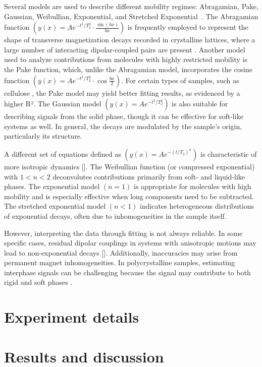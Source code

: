 \documentclass[a4paper,12pt]{article}
\begin{document}
Several models are used to describe different mobility regimes: Abragamian, Pake, Gaussian, Weibullian, Exponential, and Stretched Exponential~\cite{Rntzsch2018}. 
The Abragamian function \((y(x) = A e^{-t^2/T_2^2} \cdot \frac{\sin(bx)}{bx})\) is frequently employed to represent the shape of transverse magnetization decays recorded in crystalline lattices, where a large number of interacting dipolar-coupled pairs are present \cite{Besghini2019}. 
Another model used to analyze contributions from molecules with highly restricted mobility is the Pake function, which, unlike the Abragamian model, incorporates the cosine function \((y(x) = A e^{-t^2/T_2^2} \cdot \cos \frac{bx}{2})\).
For certain types of samples, such as cellulose \cite{Grunin2017, Grunin2019}, the Pake model may yield better fitting results, as evidenced by a higher R². 
The Gaussian model \((y(x) = A e^{-t^2/T_2^2})\) is also suitable for describing signals from the solid phase, though it can be effective for soft-like systems as well. 
In general, the decays are modulated by the sample’s origin, particularly its structure.

A different set of equations defined as \((y(x) = A e^{-(t/T_2)^n})\) is characteristic of more isotropic dynamics []. 
The Weibullian function (or compressed exponential) \cite{Rntzsch2018} with \(1 < n < 2\) deconvolutes contributions primarily from soft- and liquid-like phases. The exponential model \((n = 1)\) is appropriate for molecules with high mobility and is especially effective when long components need to be subtracted. 
The stretched exponential model \((n < 1)\) indicates heterogeneous distributions of exponential decays, often due to inhomogeneities in the sample itself.

However, interpreting the data through fitting is not always reliable. 
In some specific cases, residual dipolar couplings in systems with anisotropic motions may lead to non-exponential decays []. 
Additionally, inaccuracies may arise from permanent magnet inhomogeneities. 
In polycrystalline samples, estimating interphase signals can be challenging because the signal may contribute to both rigid and soft phases \cite{Gorbunova2022}.

\newpage
\section{Experiment details}

\newpage
\section{Results and discussion}\label{sec:Results and discussion}
\end{document}
